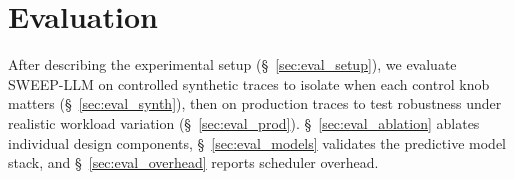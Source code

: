 %
%
%
%
%
%
%
%
%
%



\section{Evaluation}
\label{sec:evaluation}

After describing the experimental setup (\S~\ref{sec:eval_setup}), we evaluate SWEEP-LLM on controlled synthetic traces to isolate when each control knob matters (\S~\ref{sec:eval_synth}), then on production traces to test robustness under realistic workload variation (\S~\ref{sec:eval_prod}).
\S~\ref{sec:eval_ablation} ablates individual design components, \S~\ref{sec:eval_models} validates the predictive model stack, and \S~\ref{sec:eval_overhead} reports scheduler overhead.


